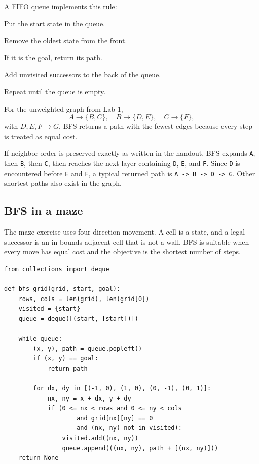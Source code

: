 A FIFO queue implements this rule:

\begin{mlsteps}
  \item Put the start state in the queue.
  \item Remove the oldest state from the front.
  \item If it is the goal, return its path.
  \item Add unvisited successors to the back of the queue.
  \item Repeat until the queue is empty.
\end{mlsteps}

For the unweighted graph from Lab 1,
\[
A\rightarrow\{B,C\},\quad B\rightarrow\{D,E\},\quad C\rightarrow\{F\},
\]
with \(D,E,F\rightarrow G\), BFS returns a path with the fewest edges because every step is treated as equal cost.

\begin{workedexample}
If neighbor order is preserved exactly as written in the handout, BFS expands \texttt{A}, then \texttt{B}, then \texttt{C}, then reaches the next layer containing \texttt{D}, \texttt{E}, and \texttt{F}. Since \texttt{D} is encountered before \texttt{E} and \texttt{F}, a typical returned path is \texttt{A -> B -> D -> G}. Other shortest paths also exist in the graph.
\end{workedexample}

\subsection{BFS in a maze}

The maze exercise uses four-direction movement. A cell is a state, and a legal successor is an in-bounds adjacent cell that is not a wall. BFS is suitable when every move has equal cost and the objective is the shortest number of steps.

\begin{lstlisting}[style=mlpython]
from collections import deque

def bfs_grid(grid, start, goal):
    rows, cols = len(grid), len(grid[0])
    visited = {start}
    queue = deque([(start, [start])])

    while queue:
        (x, y), path = queue.popleft()
        if (x, y) == goal:
            return path

        for dx, dy in [(-1, 0), (1, 0), (0, -1), (0, 1)]:
            nx, ny = x + dx, y + dy
            if (0 <= nx < rows and 0 <= ny < cols
                    and grid[nx][ny] == 0
                    and (nx, ny) not in visited):
                visited.add((nx, ny))
                queue.append(((nx, ny), path + [(nx, ny)]))
    return None
\end{lstlisting}

